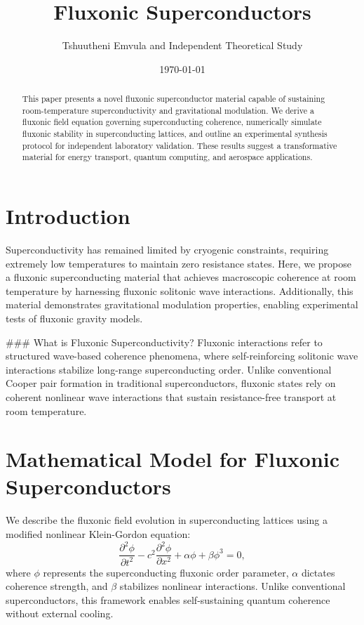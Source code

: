 \documentclass{article}
\title{ Fluxonic Superconductors }
\author{Tshuutheni Emvula and Independent Theoretical Study}
\date{\today}
\begin{document}
\maketitle

\begin{abstract}
This paper presents a novel fluxonic superconductor material capable of sustaining room-temperature superconductivity and gravitational modulation. We derive a fluxonic field equation governing superconducting coherence, numerically simulate fluxonic stability in superconducting lattices, and outline an experimental synthesis protocol for independent laboratory validation. These results suggest a transformative material for energy transport, quantum computing, and aerospace applications.
\end{abstract}

\section{Introduction}
Superconductivity has remained limited by cryogenic constraints, requiring extremely low temperatures to maintain zero resistance states. Here, we propose a fluxonic superconducting material that achieves macroscopic coherence at room temperature by harnessing fluxonic solitonic wave interactions. Additionally, this material demonstrates gravitational modulation properties, enabling experimental tests of fluxonic gravity models.

### What is Fluxonic Superconductivity?
Fluxonic interactions refer to structured wave-based coherence phenomena, where self-reinforcing solitonic wave interactions stabilize long-range superconducting order. Unlike conventional Cooper pair formation in traditional superconductors, fluxonic states rely on coherent nonlinear wave interactions that sustain resistance-free transport at room temperature.

\section{Mathematical Model for Fluxonic Superconductors}
We describe the fluxonic field evolution in superconducting lattices using a modified nonlinear Klein-Gordon equation:
\begin{equation}
    \frac{\partial^2 \phi}{\partial t^2} - c^2 \frac{\partial^2 \phi}{\partial x^2} + \alpha \phi + \beta \phi^3 = 0,
\end{equation}
where \(\phi\) represents the superconducting fluxonic order parameter, \(\alpha\) dictates coherence strength, and \(\beta\) stabilizes nonlinear interactions. Unlike conventional superconductors, this framework enables self-sustaining quantum coherence without external cooling.
\end{document}
